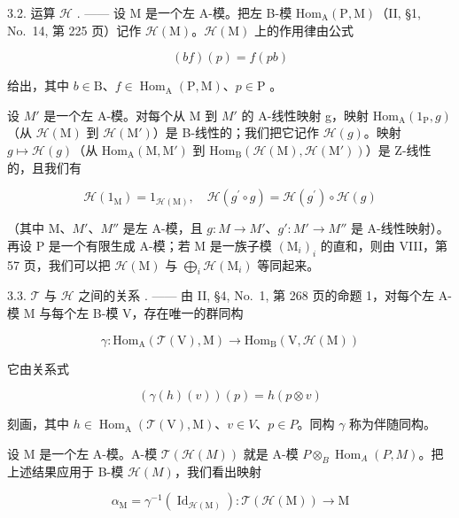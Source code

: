 3.2. 运算 \(\mathcal{H}\) . —— 设 M 是一个左 A-模。把左 B-模 \(\mathrm{Hom}_{\mathrm{A}}(\mathrm{P},\mathrm{M})\)（II, §1, No.~14, 第 225 页）记作 \(\mathcal{H}(\mathrm{M})\)。\(\mathcal{H}(\mathrm{M})\) 上的作用律由公式

\[
(b f) (p) = f (p b)\tag{3}
\]

给出，其中 \(b \in \mathrm{B}\)、\(f \in \operatorname{Hom}_{\mathrm{A}}(\mathrm{P}, \mathrm{M})\)、\(p \in \mathrm{P}\) 。

设 \(M'\) 是一个左 A-模。对每个从 M 到 \(M'\) 的 A-线性映射 g，映射 \(\mathrm{Hom}_{\mathrm{A}}(1_{\mathrm{P}}, g)\)（从 \(\mathcal{H}(\mathrm{M})\) 到 \(\mathcal{H}(\mathrm{M}')\)）是 B-线性的；我们把它记作 \(\mathcal{H}(g)\)。映射 \(g \mapsto \mathcal{H}(g)\)（从 \(\mathrm{Hom}_{\mathrm{A}}(\mathrm{M}, \mathrm{M}')\) 到 \(\mathrm{Hom}_{\mathrm{B}}(\mathcal{H}(\mathrm{M}), \mathcal{H}(\mathrm{M}'))\)）是 Z-线性的，且我们有

\[
\mathcal {H} (1 _ {\mathrm{M}}) = 1 _ {\mathcal {H} (\mathrm{M})}, \quad \mathcal {H} (g ^ {\prime} \circ g) = \mathcal {H} (g ^ {\prime}) \circ \mathcal {H} (g)\tag{4}
\]

（其中 M、\(M'\)、\(M''\) 是左 A-模，且 \(g : M \to M'\)、\(g' : M' \to M''\) 是 A-线性映射）。再设 P 是一个有限生成 A-模；若 M 是一族子模 \((\mathrm{M}_{i})_{i}\) 的直和，则由 VIII，第 57 页，我们可以把 \(\mathcal{H}(\mathrm{M})\) 与 \(\bigoplus_{i} \mathcal{H}(\mathrm{M}_{i})\) 等同起来。

3.3. \(\mathcal{T}\) 与 \(\mathcal{H}\) 之间的关系 . —— 由 II, §4, No.~1, 第 268 页的命题 1，对每个左 A-模 M 与每个左 B-模 V，存在唯一的群同构

\[
\gamma : \mathrm{Hom} _ {\mathrm{A}} (\mathcal {T} (\mathrm{V}), \mathrm{M}) \longrightarrow \mathrm{Hom} _ {\mathrm{B}} (\mathrm{V}, \mathcal {H} (\mathrm{M}))\tag{5}
\]

它由关系式

\[
(\gamma (h) (v)) (p) = h (p \otimes v)\tag{6}
\]

刻画，其中 \(h \in \operatorname{Hom}_{\mathrm{A}}(\mathcal{T}(\mathrm{V}), \mathrm{M})\)、\(v \in V\)、\(p \in P\)。同构 \(\gamma\) 称为伴随同构。

设 M 是一个左 A-模。A-模 \(\mathcal{T}(\mathcal{H}(M))\) 就是 A-模 \(P \otimes_{B} \operatorname{Hom}_{A}(P, M)\)。把上述结果应用于 B-模 \(\mathcal{H}(M)\)，我们看出映射

\[
\alpha_ {\mathrm{M}} = \gamma^ {- 1} (\operatorname{Id} _ {\mathcal {H} (\mathrm{M})}): \mathcal {T} (\mathcal {H} (\mathrm{M})) \longrightarrow \mathrm{M}
\]

